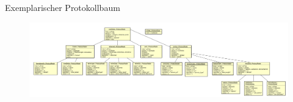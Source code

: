\begin{frame}{Exemplarischer Protokollbaum}
    \begin{figure}
    	\centering
    	\includegraphics[width=\textwidth]{./images/prototree/baum8.pdf}
    \end{figure}
\end{frame}